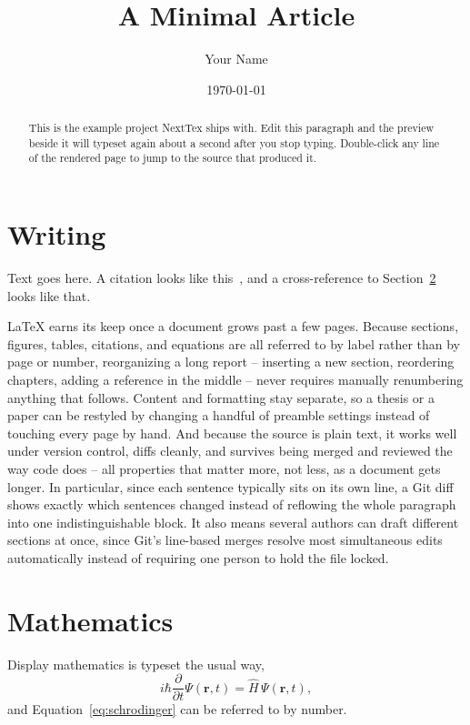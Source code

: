 \documentclass[11pt]{article}
\title{A Minimal Article}
\author{Your Name}
\date{\today}
\begin{document}
\maketitle

\begin{abstract}
  This is the example project NextTex ships with. Edit this paragraph and
  the preview beside it will typeset again about a second after you stop
  typing. Double-click any line of the rendered page to jump to the source
  that produced it.
\end{abstract}

\section{Writing}
\label{sec:writing}

Text goes here. A citation looks like this~\cite{knuth1984}, and a
cross-reference to Section~\ref{sec:maths} looks like that.

LaTeX earns its keep once a document grows past a few pages. Because
sections, figures, tables, citations, and equations are all referred to by
label rather than by page or number, reorganizing a long report --
inserting a new section, reordering chapters, adding a reference in the
middle -- never requires manually renumbering anything that follows.
Content and formatting stay separate, so a thesis or a paper can be
restyled by changing a handful of preamble settings instead of touching
every page by hand. And because the source is plain text, it works well
under version control, diffs cleanly, and survives being merged and
reviewed the way code does -- all properties that matter more, not less,
as a document gets longer. In particular, since each sentence typically
sits on its own line, a Git diff shows exactly which sentences changed
instead of reflowing the whole paragraph into one indistinguishable
block. It also means several authors can draft different sections at once,
since Git's line-based merges resolve most simultaneous edits
automatically instead of requiring one person to hold the file locked.

\section{Mathematics}
\label{sec:maths}

Display mathematics is typeset the usual way,
\begin{equation}
  i\hbar \frac{\partial}{\partial t}\Psi(\mathbf{r}, t)
    = \hat{H}\,\Psi(\mathbf{r}, t),
  \label{eq:schrodinger}
\end{equation}
and Equation~\eqref{eq:schrodinger} can be referred to by number.
\end{document}
